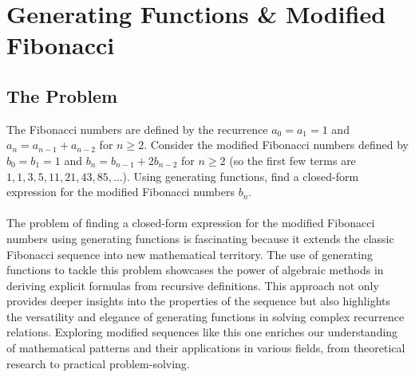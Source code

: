 \section{Generating Functions & Modified Fibonacci}
\subsection{The Problem}
The Fibonacci numbers are defined by the recurrence $a_0 = a_1 = 1$ and $a_n = a_{n-1} + a_{n-2}$ for $n \geq 2$.
Consider the modified Fibonacci numbers defined by $b_0 = b_1 = 1$ and $b_n = b_{n-1} + 2b_{n-2}$ for $n \geq 2$ (so the first few terms are $1, 1, 3, 5, 11, 21, 43, 85, \ldots$).
Using generating functions, find a closed-form expression for the modified Fibonacci numbers $b_n$.\\
\\
The problem of finding a closed-form expression for the modified Fibonacci numbers using generating functions is fascinating because it extends the classic Fibonacci sequence into new mathematical territory.
The use of generating functions to tackle this problem showcases the power of algebraic methods in deriving explicit formulas from recursive definitions. This approach not only provides deeper insights into the properties of the sequence but also highlights the versatility and elegance of generating functions in solving complex recurrence relations. Exploring modified sequences like this one enriches our understanding of mathematical patterns and their applications in various fields, from theoretical research to practical problem-solving.
